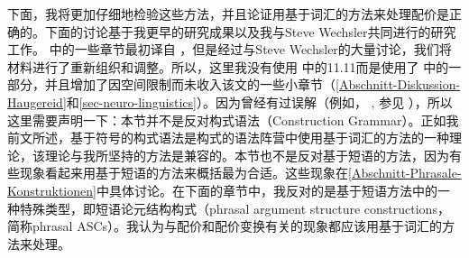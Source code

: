 下面，我将更加仔细地检验这些方法，并且论证用基于词汇的方法来处理配价是正确的。下面的讨论基于我更早的研究成果\citep{Mueller2006d,Mueller2007d,MuellerPersian}以及我与Steve Wechsler共同进行的研究工作\citep{MWArgSt,MWArgStReply}。 \citet{MWArgSt}中的一些章节最初译自 \citet{MuellerGTBuch2}，但是经过与Steve Wechsler的大量讨论，我们将材料进行了重新组织和调整。所以，这里我没有使用 中的11.11而是使用了 中的一部分，并且增加了因空间限制而未收入该文的一些小章节（\ref{Abschnitt-Diskussion-Haugereid}和\ref{sec-neuro-linguistics}）。因为曾经有过误解（例如， , 参见  ），所以这里需要声明一下：本节并不是反对构式语法\indexcxg（Construction Grammar）。正如我前文所述，基于符号的构式语法是构式的语法阵营中使用基于词汇的方法的一种理论，该理论与我所坚持的方法是兼容的。本节也不是反对基于短语的方法，因为有些现象看起来用基于短语的方法来概括最为合适。这些现象在\ref{Abschnitt-Phrasale-Konstruktionen}中具体讨论。在下面的章节中，我反对的是基于短语方法中的一种特殊类型，即短语论元结构构式（phrasal argument structure constructions，简称phrasal ASCs）。我认为与配价和配价变换有关的现象都应该用基于词汇的方法来处理。

